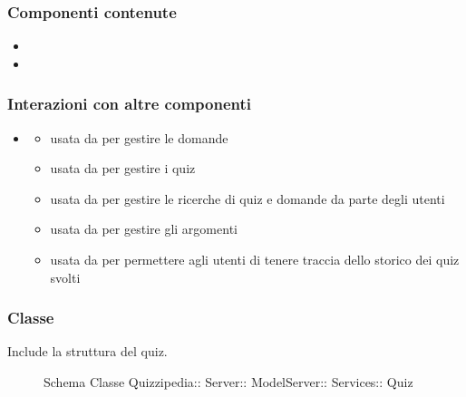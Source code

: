 \subsubsection{Componenti contenute}
\begin{itemize}
\item {}
\item {}
\end{itemize}
\subsubsection{Interazioni con altre componenti}
\begin{itemize}
\item {}
\begin{itemize}
\item usata da  per gestire le domande
\item usata da  per gestire i quiz
\item usata da  per gestire le ricerche di quiz e domande da parte degli utenti
\item usata da  per gestire gli argomenti
\item usata da  per permettere agli utenti di tenere traccia dello storico dei quiz svolti
\end{itemize}
\end{itemize}
\subsubsection{Classe }
Include la struttura del quiz.
\begin{figure}[H]
\centering
\noindent{}
\caption[Schema Classe Quiz]{Schema Classe Quizzipedia:: Server:: ModelServer:: Services:: Quiz}
\end{figure}
